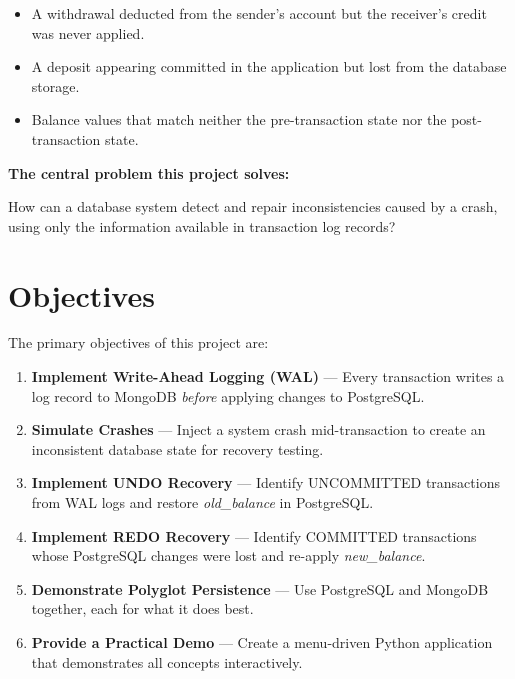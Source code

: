 \begin{itemize}
  \item A withdrawal deducted from the sender's account but the receiver's
        credit was never applied.
  \item A deposit appearing committed in the application but lost from
        the database storage.
  \item Balance values that match neither the pre-transaction state nor
        the post-transaction state.
\end{itemize}

\noindent\textbf{The central problem this project solves:}

\begin{conceptbox}
How can a database system detect and repair inconsistencies caused by a
crash, using only the information available in transaction log records?
\end{conceptbox}

\chapter{Objectives}

The primary objectives of this project are:

\begin{enumerate}
  \item \textbf{Implement Write-Ahead Logging (WAL)} --- Every transaction
        writes a log record to MongoDB \textit{before} applying changes to
        PostgreSQL.

  \item \textbf{Simulate Crashes} --- Inject a system crash mid-transaction
        to create an inconsistent database state for recovery testing.

  \item \textbf{Implement UNDO Recovery} --- Identify UNCOMMITTED transactions
        from WAL logs and restore \textit{old\_balance} in PostgreSQL.

  \item \textbf{Implement REDO Recovery} --- Identify COMMITTED transactions
        whose PostgreSQL changes were lost and re-apply \textit{new\_balance}.

  \item \textbf{Demonstrate Polyglot Persistence} --- Use PostgreSQL and
        MongoDB together, each for what it does best.

  \item \textbf{Provide a Practical Demo} --- Create a menu-driven Python
        application that demonstrates all concepts interactively.
\end{enumerate}

